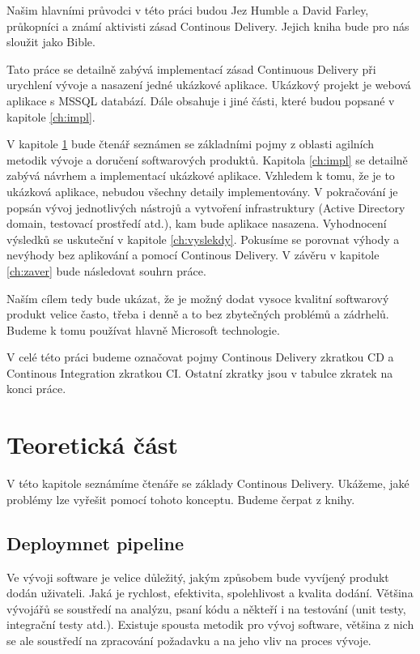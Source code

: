 Našim hlavními průvodci v této práci budou Jez Humble a David Farley, průkopníci a známí aktivisti zásad Continous Delivery. Jejich kniha \cite{ContDelivery} bude pro nás sloužit jako Bible. 

Tato práce se detailně zabývá implementací zásad Continuous Delivery při urychlení vývoje a nasazení jedné ukázkové aplikace. Ukázkový projekt je webová aplikace s MSSQL databází. Dále obsahuje i jiné části, které budou popsané v kapitole \ref{ch:impl}. 

V kapitole \ref{ch:teorie} bude čtenář seznámen se základními pojmy z oblasti agilních metodik vývoje a doručení softwarových produktů. Kapitola \ref{ch:impl} se detailně zabývá návrhem a implementací ukázkové aplikace. Vzhledem k tomu, že je to ukázková aplikace, nebudou všechny detaily implementovány. V pokračování je popsán vývoj jednotlivých nástrojů a vytvoření infrastruktury (Active Directory domain, testovací prostředí atd.), kam bude aplikace nasazena. Vyhodnocení výsledků se uskuteční v kapitole \ref{ch:vyslekdy}. Pokusíme se porovnat výhody a nevýhody bez aplikování a pomocí Continous Delivery. V závěru v kapitole \ref{ch:zaver} bude následovat souhrn práce.

Naším cílem tedy bude ukázat, že je možný dodat vysoce kvalitní softwarový produkt velice často, třeba i denně a to bez zbytečných problémů a zádrhelů. Budeme k tomu používat hlavně Microsoft technologie.

V celé této práci budeme označovat pojmy Continous Delivery zkratkou CD a Continous Integration zkratkou CI. Ostatní zkratky jsou v tabulce zkratek na konci práce.

\chapter{Teoretická část}
\label{ch:teorie}
V této kapitole seznámíme čtenáře se základy Continous Delivery. Ukážeme, jaké problémy lze vyřešit pomocí tohoto konceptu. Budeme čerpat z knihy\cite{ContDelivery}.

\section{Deploymnet pipeline}
Ve vývoji software je velice důležitý, jakým způsobem bude vyvíjený produkt dodán uživateli. Jaká je rychlost, efektivita, spolehlivost a kvalita dodání. Většina vývojářů se soustředí na analýzu, psaní kódu a někteří i na testování (unit testy, integrační testy atd.).
Existuje spousta metodik pro vývoj software, většina z nich se ale  soustředí na zpracování požadavku a na jeho vliv na proces vývoje.

